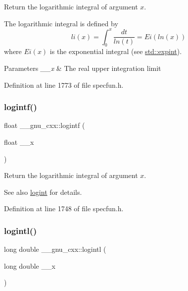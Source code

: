 Return the logarithmic integral of argument $ x $.

The logarithmic integral is defined by \[ li(x) = \int_0^x \frac{dt}{ln(t)} = Ei(ln(x)) \] where $ Ei(x) $ is the exponential integral (see \hyperlink{group__cxx17__math__spec__func_ga0e9ac717a106ef54184b5f058c451782}{std\+::expint}).


\begin{DoxyParams}{Parameters}
{\em \+\_\+\+\_\+x} & The real upper integration limit \\
\hline
\end{DoxyParams}


Definition at line 1773 of file specfun.\+h.

\mbox{\label{group__gnu__math__spec__func_gab878da3ba2f5c1d49d96eadde533b233}} 
\subsubsection{\texorpdfstring{logintf()}{logintf()}}
{\footnotesize\ttfamily float \+\_\+\+\_\+gnu\+\_\+cxx\+::logintf (\begin{DoxyParamCaption}\item[{float}]{\+\_\+\+\_\+x }\end{DoxyParamCaption})\hspace{0.3cm}{\ttfamily [inline]}}

Return the logarithmic integral of argument $ x $.

\begin{DoxySeeAlso}{See also}
\hyperlink{group__gnu__math__spec__func_ga1c0fe0f4cb72041f24db82dc7e47df11}{logint} for details. 
\end{DoxySeeAlso}


Definition at line 1748 of file specfun.\+h.

\mbox{\label{group__gnu__math__spec__func_gab17f5cadc8f77ba2666d0d5ecc78de5d}} 
\subsubsection{\texorpdfstring{logintl()}{logintl()}}
{\footnotesize\ttfamily long double \+\_\+\+\_\+gnu\+\_\+cxx\+::logintl (\begin{DoxyParamCaption}\item[{long double}]{\+\_\+\+\_\+x }\end{DoxyParamCaption})\hspace{0.3cm}{\ttfamily [inline]}}

